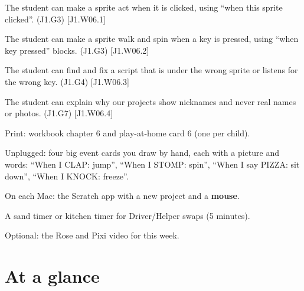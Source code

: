 
\begin{objectives}
  \item The student can make a sprite act when it is clicked, using \enquote{when this sprite clicked}. (J1.G3) [J1.W06.1]
  \item The student can make a sprite walk and spin when a key is pressed, using \enquote{when key pressed} blocks. (J1.G3) [J1.W06.2]
  \item The student can find and fix a script that is under the wrong sprite or listens for the wrong key. (J1.G4) [J1.W06.3]
  \item The student can explain why our projects show nicknames and never real names or photos. (J1.G7) [J1.W06.4]
\end{objectives}

\begin{materials}
  \item Print: workbook chapter 6 and play-at-home card 6 (one per child).
  \item Unplugged: four big event cards you draw by hand, each with a picture and words: \enquote{When I CLAP: jump}, \enquote{When I STOMP: spin}, \enquote{When I say PIZZA: sit down}, \enquote{When I KNOCK: freeze}.
  \item On each Mac: the Scratch app with a new project and a \textbf{mouse}.
  \item A sand timer or kitchen timer for Driver/Helper swaps (5 minutes).
  \item Optional: the Rose and Pixi video for this week.
\end{materials}

\section{At a glance}
\begin{timeplan}
\end{timeplan}

